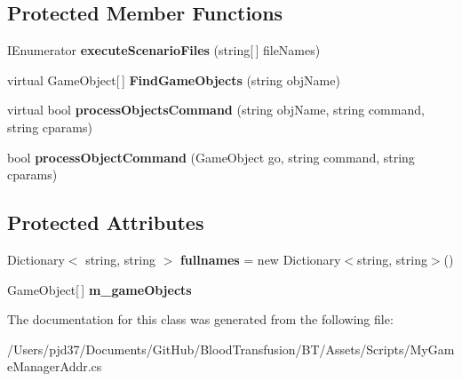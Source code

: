 \subsection*{Protected Member Functions}
\begin{DoxyCompactItemize}
\item 
I\+Enumerator {\bfseries execute\+Scenario\+Files} (string\mbox{[}$\,$\mbox{]} file\+Names)\hypertarget{class_little_brain_1_1_g_m_addr_1_1_my_game_manager_addr_aff691c870245d8336108fe8d3a89a154}{}\label{class_little_brain_1_1_g_m_addr_1_1_my_game_manager_addr_aff691c870245d8336108fe8d3a89a154}

\item 
virtual Game\+Object\mbox{[}$\,$\mbox{]} {\bfseries Find\+Game\+Objects} (string obj\+Name)\hypertarget{class_little_brain_1_1_g_m_addr_1_1_my_game_manager_addr_a99aa520b3cc701a2adce8ee678dcca16}{}\label{class_little_brain_1_1_g_m_addr_1_1_my_game_manager_addr_a99aa520b3cc701a2adce8ee678dcca16}

\item 
virtual bool {\bfseries process\+Objects\+Command} (string obj\+Name, string command, string cparams)\hypertarget{class_little_brain_1_1_g_m_addr_1_1_my_game_manager_addr_a0b7b66af66e5e72c6e23a198734c0987}{}\label{class_little_brain_1_1_g_m_addr_1_1_my_game_manager_addr_a0b7b66af66e5e72c6e23a198734c0987}

\item 
bool {\bfseries process\+Object\+Command} (Game\+Object go, string command, string cparams)\hypertarget{class_little_brain_1_1_g_m_addr_1_1_my_game_manager_addr_a65c54a4ac6479663363a4cd76795d851}{}\label{class_little_brain_1_1_g_m_addr_1_1_my_game_manager_addr_a65c54a4ac6479663363a4cd76795d851}

\end{DoxyCompactItemize}
\subsection*{Protected Attributes}
\begin{DoxyCompactItemize}
\item 
Dictionary$<$ string, string $>$ {\bfseries fullnames} = new Dictionary$<$string, string$>$()\hypertarget{class_little_brain_1_1_g_m_addr_1_1_my_game_manager_addr_aadf85834bf193af40872d27565e28b2c}{}\label{class_little_brain_1_1_g_m_addr_1_1_my_game_manager_addr_aadf85834bf193af40872d27565e28b2c}

\item 
Game\+Object\mbox{[}$\,$\mbox{]} {\bfseries m\+\_\+game\+Objects}\hypertarget{class_little_brain_1_1_g_m_addr_1_1_my_game_manager_addr_ac001608491bfde6f7894e6876e1ed9c3}{}\label{class_little_brain_1_1_g_m_addr_1_1_my_game_manager_addr_ac001608491bfde6f7894e6876e1ed9c3}

\end{DoxyCompactItemize}


The documentation for this class was generated from the following file\+:\begin{DoxyCompactItemize}
\item 
/\+Users/pjd37/\+Documents/\+Git\+Hub/\+Blood\+Transfusion/\+B\+T/\+Assets/\+Scripts/My\+Game\+Manager\+Addr.\+cs\end{DoxyCompactItemize}
